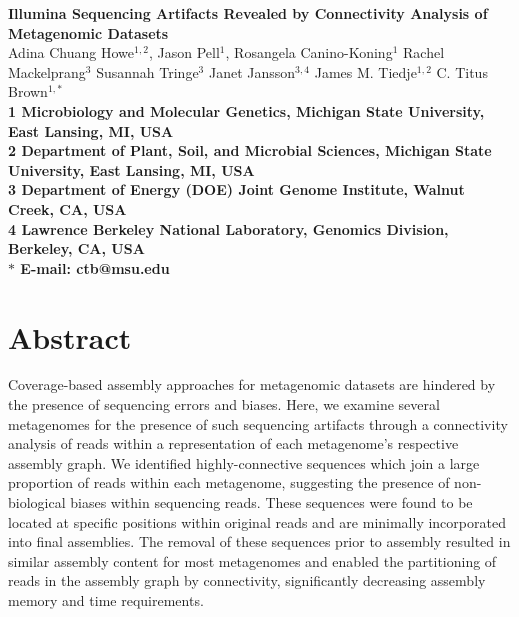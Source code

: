 \documentclass[10pt]{article}
\date{}
\begin{document}
\begin{flushleft}
{\Large
\textbf{Illumina Sequencing Artifacts Revealed by Connectivity Analysis of Metagenomic Datasets}
}
\\
Adina Chuang Howe$^{1,2}$, 
Jason Pell$^{1}$,
Rosangela Canino-Koning$^{1}$
Rachel Mackelprang$^{3}$
Susannah Tringe$^{3}$
Janet Jansson$^{3,4}$ 
James M. Tiedje$^{1,2}$
C. Titus Brown$^{1,\ast}$
\\
\bf{1} Microbiology and Molecular Genetics, Michigan State University, East Lansing, MI, USA
\\
\bf{2} Department of Plant, Soil, and Microbial Sciences, Michigan State University, East Lansing, MI, USA
\\
\bf{3} Department of Energy (DOE) Joint Genome Institute, Walnut Creek, CA, USA
\\
\bf{4} Lawrence Berkeley National Laboratory, Genomics Division, Berkeley, CA, USA
\\
$\ast$ E-mail: ctb@msu.edu
\end{flushleft}

\section*{Abstract}
Coverage-based assembly approaches for metagenomic datasets are hindered by the presence of sequencing errors and biases.  Here, we examine several metagenomes for the presence of such sequencing artifacts through a connectivity analysis of reads within a representation of each metagenome's respective assembly graph.  We identified highly-connective sequences which join a large proportion of reads within each metagenome, suggesting the presence of non-biological biases within sequencing reads.  These sequences were found to be located at specific positions within original reads and are minimally incorporated into final assemblies.  The removal of these sequences prior to assembly resulted in similar assembly content for most metagenomes and enabled the partitioning of reads in the assembly graph by connectivity, significantly decreasing assembly memory and time requirements.    
\end{document}
